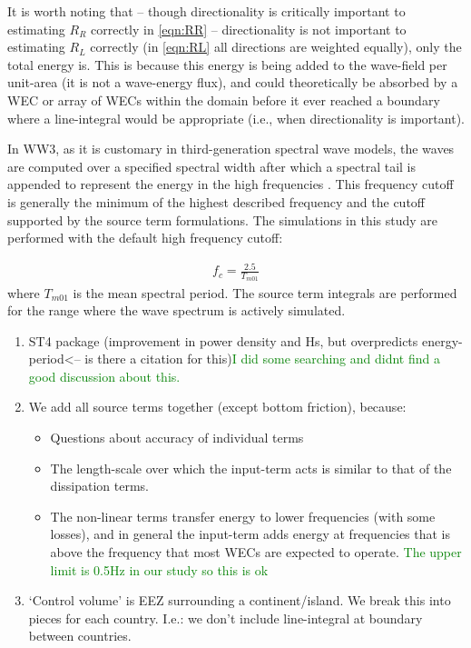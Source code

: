 It is worth noting that -- though directionality is critically important to estimating $R_R$ correctly in \eqref{eqn:RR} -- directionality is not important to estimating $R_L$ correctly (in \eqref{eqn:RL} all directions are weighted equally), only the total energy is. This is because this energy is being added to the wave-field per unit-area (it is not a wave-energy flux), and could theoretically be absorbed by a WEC or array of WECs within the domain before it ever reached a boundary where a line-integral would be appropriate (i.e., when directionality is important).

In WW3, as it is customary in third-generation spectral wave models, the waves are computed over a specified spectral width after which a spectral tail is appended to represent the energy in the high frequencies \citep[e.g.][]{ardhuinObservationSwellDissipation2009}. This frequency cutoff is generally the minimum of the highest described frequency and the cutoff supported by the source term formulations. The simulations in this study are performed with the default high frequency cutoff:

\begin{align}
  f_{c} = \frac{2.5}{T_{m01}}
\end{align}
where $T_{m01}$ is the mean spectral period. The source term integrals are performed for the range where the wave spectrum is actively simulated.

\begin{enumerate}
\item ST4 package (improvement in power density and Hs, but overpredicts energy-period<-- is there a citation for this)\textcolor{green}{I did some searching and didnt find a good discussion about this.}
\item We add all source terms together (except bottom friction), because:
  \begin{itemize}
  \item Questions about accuracy of individual terms \citep{garcia-medinaWaveResourceAssessment2014}
  \item The length-scale over which the input-term acts is similar to that of the dissipation terms.
  \item The non-linear terms transfer energy to lower frequencies (with some losses), and in general the input-term adds energy at frequencies that is above the frequency that most WECs are expected to operate.  \textcolor{green}{The upper limit is 0.5Hz in our study so this is ok}
  \end{itemize}
\item ‘Control volume’ is EEZ surrounding a continent/island. We break this into pieces for each country. I.e.: we don’t include line-integral at boundary between countries.
\end{enumerate}

